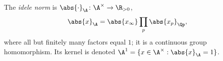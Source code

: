 The \emph{idele norm} is $\abs{\cdot}_\A\colon\A^\times\to\R_{>0}$,
\[
  \abs{x}_\A=\abs{x_\infty}\prod_p\abs{x_p}_{\Qp},
\]
where all but finitely many factors equal $1$; it is a continuous group homomorphism. Its kernel is denoted
$\A^1=\{x\in\A^\times:\abs{x}_\A=1\}$.
